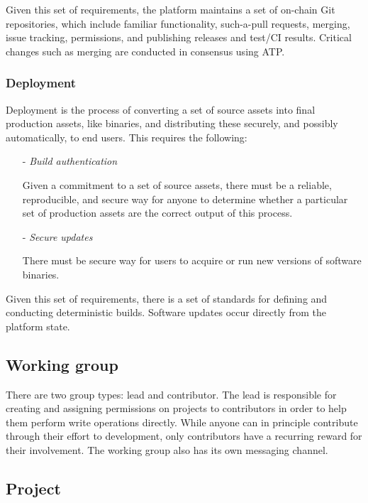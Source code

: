 \documentclass{article}
\begin{document}
Given this set of requirements, the platform maintains a set of on-chain Git repositories, which include familiar functionality, such-a-pull requests, merging, issue tracking, permissions, and publishing releases and test/CI results. Critical changes such as merging are conducted in consensus using ATP.

\subsubsection{Deployment}

Deployment is the process of converting a set of source assets into final production assets, like binaries, and distributing these securely, and possibly automatically, to end users. This requires the following:

\begin{enumerate}

    \item[-] \textit{Build authentication}

    Given a commitment to a set of source assets, there must be a reliable, reproducible, and secure way for anyone to determine whether a particular set of production assets are the correct output of this process.

    \item[-] \textit{Secure updates}

    There must be secure way for users to acquire or run new versions of software binaries.

\end{enumerate}

Given this set of requirements, there is a set of standards for defining and conducting deterministic builds. Software updates occur directly from the platform state.

\subsection{Working group}

There are two group types: lead and contributor. The lead is responsible for creating and assigning permissions on projects to contributors in order to help them perform write operations directly. While anyone can in principle contribute through their  effort to development, only contributors have a recurring reward for their involvement. The working group also has its own messaging channel.

\subsection{Project}
\end{document}
